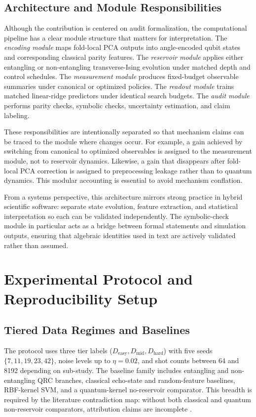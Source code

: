 \documentclass{article} %
\begin{document}
\subsection{Architecture and Module Responsibilities}
Although the contribution is centered on audit formalization, the computational pipeline has a clear module structure that matters for interpretation. The \emph{encoding module} maps fold-local PCA outputs into angle-encoded qubit states and corresponding classical parity features. The \emph{reservoir module} applies either entangling or non-entangling transverse-Ising evolution under matched depth and control schedules. The \emph{measurement module} produces fixed-budget observable summaries under canonical or optimized policies. The \emph{readout module} trains matched linear-ridge predictors under identical search budgets. The \emph{audit module} performs parity checks, symbolic checks, uncertainty estimation, and claim labeling.

These responsibilities are intentionally separated so that mechanism claims can be traced to the module where changes occur. For example, a gain achieved by switching from canonical to optimized observables is assigned to the measurement module, not to reservoir dynamics. Likewise, a gain that disappears after fold-local PCA correction is assigned to preprocessing leakage rather than to quantum dynamics. This modular accounting is essential to avoid mechanism conflation.

From a systems perspective, this architecture mirrors strong practice in hybrid scientific software: separate state evolution, feature extraction, and statistical interpretation so each can be validated independently. The symbolic-check module in particular acts as a bridge between formal statements and simulation outputs, ensuring that algebraic identities used in text are actively validated rather than assumed.

\section{Experimental Protocol and Reproducibility Setup}
\label{sec:protocol}
\subsection{Tiered Data Regimes and Baselines}
The protocol uses three tier labels ($D_{\mathrm{easy}},D_{\mathrm{mid}},D_{\mathrm{hard}}$) with five seeds $\{7,11,19,23,42\}$, noise levels up to $\eta=0.02$, and shot counts between 64 and 8192 depending on sub-study. The baseline family includes entangling and non-entangling QRC branches, classical echo-state and random-feature baselines, RBF-kernel SVM, and a quantum-kernel no-reservoir comparator. This breadth is required by the literature contradiction map: without both classical and quantum non-reservoir comparators, attribution claims are incomplete \citep{arxiv_2409_00998,arxiv_2602_14677,arxiv_2101_11020,arxiv_2212_08693}.
\end{document}

